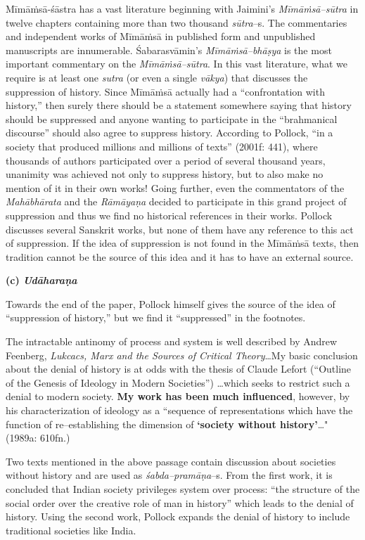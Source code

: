 Mīmāṁsā-śāstra has a vast literature beginning with Jaimini’s \textit{Mīmāṁsā–sūtra} in twelve chapters containing more than two thousand \textit{sūtra}–s. The commentaries and independent works of Mīmāṁsā in published form and unpublished manuscripts are innumerable. Śabarasvāmin’s \textit{Mīmāṁsā–bhāṣya} is the most important commentary on the \textit{Mīmāṁsā–sūtra}. In this vast literature, what we require is at least one \textit{sutra }(or even a single \textit{vākya}) that discusses the suppression of history. Since Mīmāṁsā actually had a “confrontation with history,” then surely there should be a statement somewhere saying that history should be suppressed and anyone wanting to participate in the “brahmanical discourse” should also agree to suppress history. According to Pollock, “in a society that produced millions and millions of texts” (2001f: 441), where thousands of authors participated over a period of several thousand years, unanimity was achieved not only to suppress history, but to also make no mention of it in their own works! Going further, even the commentators of the \textit{Mahābhārata} and the \textit{Rāmāyaṇa }decided to participate in this grand project of suppression and thus we find no historical references in their works. Pollock discusses several Sanskrit works, but none of them have any reference to this act of suppression. If the idea of suppression is not found in the Mīmāṁsā texts, then tradition cannot be the source of this idea and it has to have an external source.

\textbf{(c) \textit{Udāharaṇa}}

Towards the end of the paper, Pollock himself gives the source of the idea of “suppression of history,” but we find it “suppressed” in the footnotes.

\begin{myquote}
The intractable antinomy of process and system is well described by Andrew Feenberg, \textit{Lukcacs, Marx and the Sources of Critical Theory}…My basic conclusion about the denial of history is at odds with the thesis of Claude Lefort (“Outline of the Genesis of Ideology in Modern Societies”) …which seeks to restrict such a denial to modern society. \textbf{My work has been much influenced}, however, by his characterization of ideology as a ``sequence of representations which have the function of re–establishing the dimension of \textbf{`society without history'}…" (1989a: 610fn.)
\end{myquote}

Two texts mentioned in the above passage contain discussion about societies without history and are used as \textit{śabda–pramāṇa}–s. From the first work, it is concluded that Indian society privileges system over process: “the structure of the social order over the creative role of man in history” which leads to the denial of history. Using the second work, Pollock expands the denial of history to include traditional societies like India.


